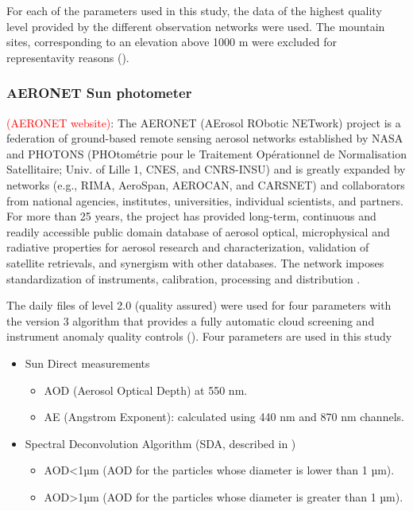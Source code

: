 \documentclass[journal abbreviation, manuscript]{copernicus}
\begin{document}
For each of the parameters used in this study, the data of the highest quality level provided by the different observation networks were used. The mountain sites, corresponding to an elevation above 1000 m were excluded for representavity reasons (\cite{kinne2013mac}).

\subsubsection{AERONET Sun photometer}
\textcolor{red}{(AERONET website)}: The AERONET (AErosol RObotic NETwork) project is a federation of ground-based remote sensing aerosol networks established by NASA and PHOTONS (PHOtométrie pour le Traitement Opérationnel de Normalisation Satellitaire; Univ. of Lille 1, CNES, and CNRS-INSU) and is greatly expanded by networks (e.g., RIMA, AeroSpan, AEROCAN, and CARSNET) and collaborators from national agencies, institutes, universities, individual scientists, and partners. For more than 25 years, the project has provided long-term, continuous and readily accessible public domain database of aerosol optical, microphysical and radiative properties for aerosol research and characterization, validation of satellite retrievals, and synergism with other databases. The network imposes standardization of instruments, calibration, processing and distribution \cite{holben2001emerging}.

The daily files of level 2.0 (quality assured) were used for four parameters with the version 3 algorithm that provides a fully automatic cloud screening and instrument anomaly quality controls  (\cite{smirnov2000cloud,smirnov2004aeronet,giles2019advancements}). Four parameters are used in this study

\begin{itemize}
 \item Sun Direct measurements
       \begin{itemize}
        \item AOD (Aerosol Optical Depth) at 550 nm.
        \item AE (Angstrom Exponent): calculated using 440 nm and 870 nm channels.
       \end{itemize}
 \item Spectral Deconvolution Algorithm (SDA, described in \cite{o2003spectral})
       \begin{itemize}
        \item AOD<1µm (AOD for the particles whose diameter is lower than 1 µm).
        \item AOD>1µm (AOD for the particles whose diameter is greater than 1 µm).
       \end{itemize}
\end{itemize}
\end{document}
